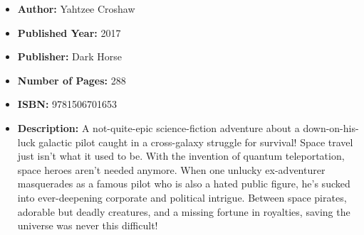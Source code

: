 \documentclass{tufte-handout}
\begin{document}
\begin{itemize}
    \item[] \textbf{Author:} Yahtzee Croshaw
    \item[] \textbf{Published Year:} 2017
    \item[] \textbf{Publisher:} Dark Horse
    \item[] \textbf{Number of Pages:} 288      
    \item[] \textbf{ISBN:} 9781506701653
    \item[] \textbf{Description:} A not-quite-epic science-fiction adventure about a down-on-his-luck galactic pilot caught in a cross-galaxy struggle for survival! Space travel just isn’t what it used to be. With the invention of quantum teleportation, space heroes aren’t needed anymore. When one unlucky ex-adventurer masquerades as a famous pilot who is also a hated public figure, he’s sucked into ever-deepening corporate and political intrigue. Between space pirates, adorable but deadly creatures, and a missing fortune in royalties, saving the universe was never this difficult!
\end{itemize}
\end{document}
